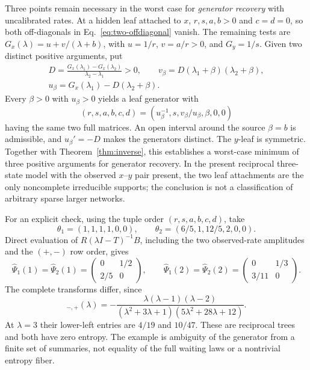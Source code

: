 Three points remain necessary in the worst case for \emph{generator recovery}
with uncalibrated rates.
At a hidden leaf attached to $x$, $r,s,a,b>0$ and $c=d=0$, so both
off-diagonals in Eq.~\eqref{eq:two-offdiagonal} vanish. The remaining tests are
$G_x(\lambda)=u+v/(\lambda+b)$, with $u=1/r$, $v=a/r>0$, and $G_y=1/s$.
Given two distinct positive arguments, put
\begin{gather}
 D=\frac{G_x(\lambda_1)-G_x(\lambda_2)}{\lambda_2-\lambda_1}>0,\qquad
 v_\beta=D(\lambda_1+\beta)(\lambda_2+\beta),\\
 u_\beta=G_x(\lambda_1)-D(\lambda_2+\beta).
\end{gather}
Every $\beta>0$ with $u_\beta>0$ yields a leaf generator with
\begin{equation}
 (r,s,a,b,c,d)=(u_\beta^{-1},s,v_\beta/u_\beta,\beta,0,0)
 \label{eq:two-leaf-family}
\end{equation}
having the same two full matrices. An open interval around the source
$\beta=b$ is admissible, and $u_\beta'=-D$ makes the generators distinct.
The $y$-leaf is symmetric. Together with Theorem~\ref{thm:inverse}, this
establishes a worst-case minimum of three positive arguments for generator recovery. In the present
reciprocal three-state model with the observed $x$--$y$ pair present, the two
leaf attachments are the only noncomplete irreducible supports; the conclusion
is not a classification of arbitrary sparse larger networks.

For an explicit check, using the tuple order \emph{$(r,s,a,b,c,d)$}, take
\begin{equation}
 \theta_1=(1,1,1,1,0,0),\qquad
 \theta_2=(6/5,1,12/5,2,0,0).
\end{equation}
Direct evaluation of $R(\lambda I-T)^{-1}B$, including the two observed-rate
amplitudes and the $(+,-)$ row order, gives
\begin{equation}
 \widehat\Psi_1(1)=\widehat\Psi_2(1)=
 \begin{pmatrix}0&1/2\\2/5&0\end{pmatrix},\qquad
 \widehat\Psi_1(2)=\widehat\Psi_2(2)=
 \begin{pmatrix}0&1/3\\3/11&0\end{pmatrix}.
 \label{eq:two-leaf-counterexample}
\end{equation}
The complete transforms differ, since
\begin{equation}
 [\widehat\Psi_1-\widehat\Psi_2]_{-,+}(\lambda)
 =-\frac{\lambda(\lambda-1)(\lambda-2)}
 {(\lambda^2+3\lambda+1)(5\lambda^2+28\lambda+12)}.
\end{equation}
At $\lambda=3$ their lower-left entries are $4/19$ and $10/47$.
These are reciprocal trees and both have zero entropy. The example is
ambiguity of the generator from a finite set of summaries, not equality of
the full waiting laws or a nontrivial entropy fiber.

